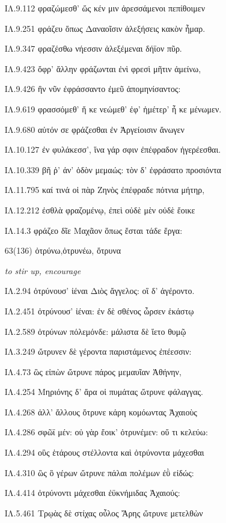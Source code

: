 \begin{enumerate}
{ΙΛ.9.112 φραζώμεσθ' ὥς κέν μιν ἀρεσσάμενοι πεπίθοιμεν 

ΙΛ.9.251 φράζευ ὅπως Δαναοῖσιν ἀλεξήσεις κακὸν ἦμαρ. 

ΙΛ.9.347 φραζέσθω νήεσσιν ἀλεξέμεναι δήϊον πῦρ. 

ΙΛ.9.423 ὄφρ' ἄλλην φράζωνται ἐνὶ φρεσὶ μῆτιν ἀμείνω, 

ΙΛ.9.426 ἣν νῦν ἐφράσσαντο ἐμεῦ ἀπομηνίσαντος: 

ΙΛ.9.619 φρασσόμεθ' ἤ κε νεώμεθ' ἐφ' ἡμέτερ' ἦ κε μένωμεν. 

ΙΛ.9.680 αὐτόν σε φράζεσθαι ἐν Ἀργείοισιν ἄνωγεν 

ΙΛ.10.127 ἐν φυλάκεσσ', ἵνα γάρ σφιν ἐπέφραδον ἠγερέεσθαι. 

ΙΛ.10.339 βῆ ῥ' ἀν' ὁδὸν μεμαώς: τὸν δ' ἐφράσατο προσιόντα 

ΙΛ.11.795 καί τινά οἱ πὰρ Ζηνὸς ἐπέφραδε πότνια μήτηρ, 

ΙΛ.12.212 ἐσθλὰ φραζομένῳ, ἐπεὶ οὐδὲ μὲν οὐδὲ ἔοικε 

ΙΛ.14.3 φράζεο δῖε Μαχᾶον ὅπως ἔσται τάδε ἔργα: 

}

\clearpage
\item[\large 63(136)]{\large \g ὀτρύνω,ὀτρυνέω, ὄτρυνα	}

\hspace{0.2cm} \textit{ to stir up, encourage }

{\g
ΙΛ.2.94 ὀτρύνουσ' ἰέναι Διὸς ἄγγελος: οἳ δ' ἀγέροντο. 

ΙΛ.2.451 ὀτρύνουσ' ἰέναι: ἐν δὲ σθένος ὦρσεν ἑκάστῳ 

ΙΛ.2.589 ὀτρύνων πόλεμόνδε: μάλιστα δὲ ἵετο θυμῷ 

ΙΛ.3.249 ὤτρυνεν δὲ γέροντα παριστάμενος ἐπέεσσιν: 

ΙΛ.4.73 ὣς εἰπὼν ὤτρυνε πάρος μεμαυῖαν Ἀθήνην, 

ΙΛ.4.254 Μηριόνης δ' ἄρα οἱ πυμάτας ὤτρυνε φάλαγγας. 

ΙΛ.4.268 ἀλλ' ἄλλους ὄτρυνε κάρη κομόωντας Ἀχαιοὺς 

ΙΛ.4.286 σφῶϊ μέν: οὐ γὰρ ἔοικ' ὀτρυνέμεν: οὔ τι κελεύω: 

ΙΛ.4.294 οὓς ἑτάρους στέλλοντα καὶ ὀτρύνοντα μάχεσθαι 

ΙΛ.4.310 ὣς ὃ γέρων ὤτρυνε πάλαι πολέμων ἐῢ εἰδώς: 

ΙΛ.4.414 ὀτρύνοντι μάχεσθαι ἐϋκνήμιδας Ἀχαιούς: 

ΙΛ.5.461 Τρῳὰς δὲ στίχας οὖλος Ἄρης ὤτρυνε μετελθὼν 

}
\end{enumerate}
